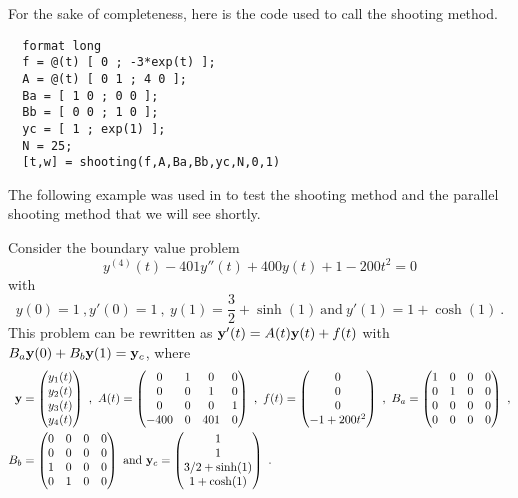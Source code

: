 \begin{egg}
For the sake of completeness, here is the code used to call the
shooting method.

\begin{code}
\small
\begin{verbatim}
  format long
  f = @(t) [ 0 ; -3*exp(t) ];
  A = @(t) [ 0 1 ; 4 0 ];
  Ba = [ 1 0 ; 0 0 ];
  Bb = [ 0 0 ; 1 0 ];
  yc = [ 1 ; exp(1) ];
  N = 25;
  [t,w] = shooting(f,A,Ba,Bb,yc,N,0,1)
\end{verbatim}
\end{code}
\label{eggShootCode1}
\end{egg}

\begin{egg}
The following example was used in \cite{CSD} to test the shooting
method and the parallel shooting method that we will see shortly.

Consider the boundary value problem
\[
  y^{(4)}(t) - 401 y''(t) + 400 y(t) +1 - 200 t^2 = 0
\]
with
\[
 y(0) = 1 \ , y'(0) = 1 \ , \ y(1) = \frac{3}{2} + \sinh(1) \
 \text{and}\  y'(1) = 1 + \cosh(1) \ .
\]
This problem can be rewritten as
$\mathbf{y}'(t) = A(t) \mathbf{y}(t) + f(t)$ with
$B_a \mathbf{y}(0) + B_b\mathbf{y}(1) = \mathbf{y}_c$, where
\begin{align*}
\mathbf{y}
&= \begin{pmatrix} y_1(t) \\ y_2(t) \\ y_3(t) \\ y_4(t) \end{pmatrix} \ ,
\ A(t) = \begin{pmatrix} 0 & 1 & 0 & 0 \\ 0 & 0 & 1 & 0 \\
0 & 0 & 0 & 1 \\ -400 & 0 & 401 & 0 \end{pmatrix} \ ,
\ f(t) = \begin{pmatrix} 0 \\ 0 \\ 0 \\ -1 + 200 t^2 \end{pmatrix} \ ,
\ B_a = \begin{pmatrix} 1 & 0 & 0 & 0 \\ 0 & 1 & 0 & 0 \\ 0 & 0 & 0 & 0 \\
0 & 0 & 0 & 0 \end{pmatrix} \ , \\
B_b &= \begin{pmatrix} 0 & 0 & 0 & 0 \\ 0 & 0 & 0 & 0 \\ 1 & 0 & 0 & 0 \\
0 & 1 & 0 & 0 \end{pmatrix} \ \text{and}
\ \mathbf{y}_c = \begin{pmatrix} 1 \\ 1 \\ 3/2 + \sinh(1) \\ 1 + \cosh(1)
\end{pmatrix} \ .
\end{align*}


\end{egg}
